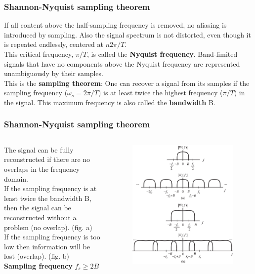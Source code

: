 \begin{frame}
	\frametitle{Shannon-Nyquist sampling theorem}
	If all content above the half-sampling frequency is removed, no aliasing is introduced by sampling. Also the signal spectrum is not distorted, even though it is repeated endlessly, centered at $n2\pi/T$.\\
	\medskip
	This critical frequency, $\pi/T$, is called the \textbf{Nyquist frequency}. Band-limited signals that have no components above the Nyquist frequency are represented unambiguously by their samples. \\
	\medskip
	This is the \textbf{sampling theorem}: One can recover a signal from its samples if the sampling frequency ($\omega_s=2\pi/T$) is at least twice the highest frequency ($\pi/T$) in the signal. This maximum frequency is also called the \textbf{bandwidth} B.
\end{frame}

\begin{frame}
	\frametitle{Shannon-Nyquist sampling theorem}
	\begin{columns}
		The signal can be fully reconstructed if there are no overlaps in the frequency domain.\\
		If the sampling frequency is at least twice the bandwidth B, then the signal can be reconstructed without a problem (no overlap). (fig. a)\\
		If the sampling frequency is too low then information will be lost (overlap). (fig. b)\\
		\medskip
		\textbf{Sampling frequency} $f_s \geq 2 B$
		\begin{figure}
			\includegraphics[width=1\linewidth]{nyquist}
		\end{figure}
	\end{columns}
\end{frame}

